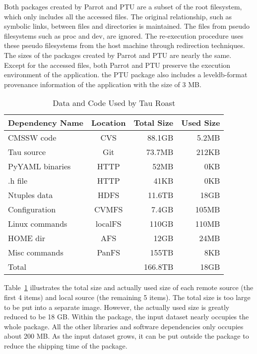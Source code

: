 Both packages created by Parrot and PTU are a subset of the root filesystem, which only includes all the accessed files. The original relationship, such as symbolic links, between files and directories is maintained. The files from pseudo filesystems such as proc and dev, are ignored. The re-execution procedure uses these pseudo filesystems from the host machine through redirection techniques.
The sizes of the packages created by Parrot and PTU are nearly the same. 
Except for the accessed files, both Parrot and PTU preserve the execution environment of the application. 
the PTU package also includes a leveldb-format provenance information of the application with the size of 3 MB.

\begin{table}
	\centering
	    \begin{tabular}{lcrr}
	        \hline
	        \bf Dependency Name & \bf Location & \bf Total Size &  \bf Used Size\\ 
	        \hline
	        CMSSW code     & CVS & 88.1GB &  5.2MB\\ \hline
	        Tau source       & Git & 73.7MB & 212KB \\ \hline
	        PyYAML binaries    & HTTP & 52MB& 0KB \\ \hline
	        .h file       & HTTP& 41KB & 0KB \\ \hline \hline
	        Ntuples data    & HDFS& 11.6TB & 18GB \\ \hline
	        Configuration & CVMFS & 7.4GB & 105MB \\ \hline
	        Linux commands & localFS & 110GB & 110MB \\ \hline     
	        HOME dir& AFS &12GB & 24MB\\ \hline
	        Misc commands & PanFS & 155TB & 8KB \\ \hline
	        Total      &    & 166.8TB     &  18GB \\ \hline
	    \end{tabular}
	    \caption{Data and Code Used by Tau Roast}
	    \label{table:size-original-real}
\end{table}
	   
Table~\ref{table:size-original-real} illustrates the total size and actually used size of each remote source (the first 4 items) and local source (the remaining 5 items).
The total size is too large to be put into a separate image. However, the actually used size is greatly reduced to be 18 GB.
Within the package, the input dataset nearly occupies the whole package. All the other libraries and software dependencies only occupies about 200 MB.
As the input dataset grows, it can be put outside the package to reduce the shipping time of the package.

